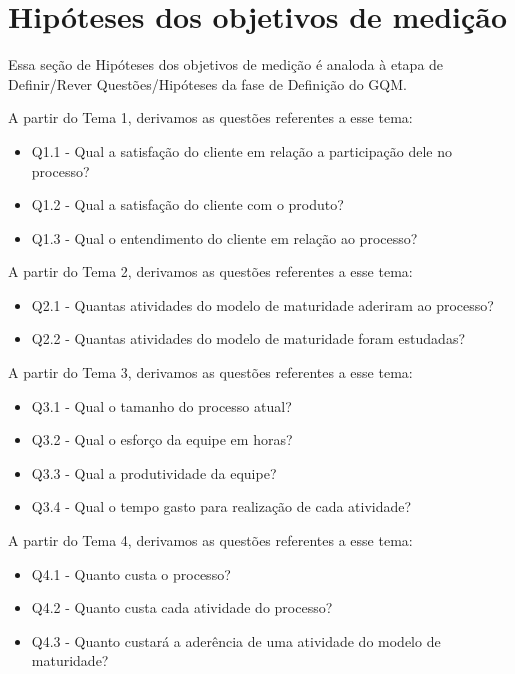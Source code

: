 \chapter{Hipóteses dos objetivos de medição}

Essa seção de Hipóteses dos objetivos de medição é analoda à etapa de Definir/Rever Questões/Hipóteses da fase de Definição do GQM.

A partir do Tema 1, derivamos as questões referentes a esse tema:

	\begin{itemize}  
	\item Q1.1 - Qual a satisfação do cliente em relação a participação dele no processo?
	\item Q1.2 - Qual a satisfação do cliente com o produto?
	\item Q1.3 - Qual o entendimento do cliente em relação ao processo?
	\end{itemize}

A partir do Tema 2, derivamos as questões referentes a esse tema:

	\begin{itemize}  
	\item Q2.1 - Quantas atividades do modelo de maturidade aderiram ao processo?
	\item Q2.2 - Quantas atividades do modelo de maturidade foram estudadas?
	\end{itemize}

A partir do Tema 3, derivamos as questões referentes a esse tema:

	\begin{itemize}  
	\item Q3.1 - Qual o tamanho do processo atual?
	\item Q3.2 - Qual o esforço da equipe em horas?
	\item Q3.3 - Qual a produtividade da equipe?
	\item Q3.4 - Qual o tempo gasto para realização de cada atividade?
	\end{itemize}

A partir do Tema 4, derivamos as questões referentes a esse tema:

	\begin{itemize}  
	\item Q4.1 - Quanto custa o processo?
	\item Q4.2 - Quanto custa cada atividade do processo?
	\item Q4.3 - Quanto custará a aderência de uma atividade do modelo de maturidade?
	\end{itemize}